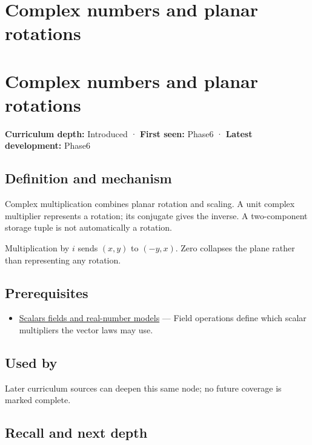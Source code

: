 \hypertarget{appendix-f77eadcc4a93}{}
\section*{Complex numbers and planar rotations}
\section{Complex numbers and planar rotations}\label{complex-numbers-and-planar-rotations}

\textbf{Curriculum depth:} Introduced · \textbf{First seen:} Phase6 · \textbf{Latest development:} Phase6

\subsection{Definition and mechanism}\label{definition-and-mechanism}

Complex multiplication combines planar rotation and scaling. A unit complex multiplier represents a rotation; its conjugate gives the inverse. A two-component storage tuple is not automatically a rotation.

Multiplication by \(i\) sends \((x,y)\) to \((-y,x)\). Zero collapses the plane rather than representing any rotation.

\subsection{Prerequisites}\label{prerequisites}

\begin{itemize}
\tightlist
\item
  \hyperref[appendix-52051ad550fe]{Scalars fields and real-number models} --- Field operations define which scalar multipliers the vector laws may use.
\end{itemize}

\subsection{Used by}\label{used-by}

Later curriculum sources can deepen this same node; no future coverage is marked complete.

\subsection{Recall and next depth}\label{recall-and-next-depth}

